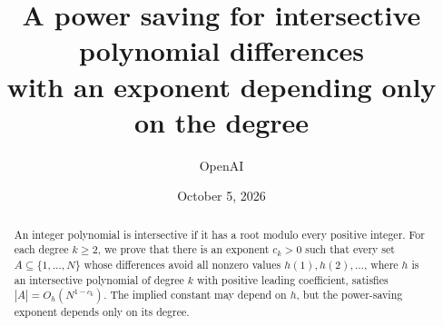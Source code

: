 \documentclass[11pt]{article}
\title{A power saving for intersective polynomial differences\\
with an exponent depending only on the degree}
\author{OpenAI}
\date{October 5, 2026}
\theoremstyle{definition}
\theoremstyle{remark}
\numberwithin{equation}{section}
\newcommand{\1}{\mathbf 1}
\begin{document}
\maketitle
\begin{abstract}
An integer polynomial is intersective if it has a root modulo every positive
integer. For each degree $k\ge2$, we prove that there is an exponent $c_k>0$
such that every set $A\subseteq\{1,\ldots,N\}$ whose differences avoid all nonzero values $h(1),h(2),\ldots$,
where $h$ is an intersective polynomial of degree $k$ with positive leading
coefficient, satisfies
$|A|=O_h(N^{1-c_k})$. The implied constant may depend on $h$, but the
power-saving exponent depends only on its degree.
\end{abstract}

\tableofcontents










\clearpage
{}
{}

\end{document}
